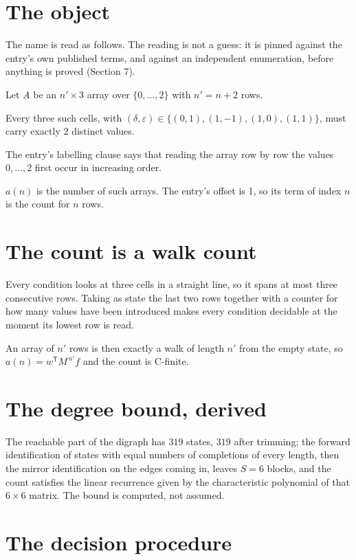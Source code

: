 \documentclass[11pt]{article}
\theoremstyle{definition}
\begin{document}
\section{The object}

The name is read as follows. The reading is not a guess: it is pinned against the entry's own published terms, and against an independent enumeration, before anything is proved (Section 7).

Let $A$ be an $n' \times 3$ array over $\{0,\dots,2\}$ with $n' = n + 2$ rows.

Every three such cells, with $(\delta,\varepsilon) \in \{(0,1), (1,-1), (1,0), (1,1)\}$, must carry exactly $2$ distinct values.

The entry's labelling clause says that reading the array row by row the values $0,\dots,2$ first occur in increasing order.

$a(n)$ is the number of such arrays. The entry's offset is 1, so its term of index $n$ is the count for $n$ rows.

\section{The count is a walk count}

Every condition looks at three cells in a straight line, so it spans at most three consecutive rows. Taking as state the last two rows together with a counter for how many values have been introduced makes every condition decidable at the moment its lowest row is read.

An array of $n'$ rows is then exactly a walk of length $n'$ from the empty state, so $a(n) = w^{\mathsf T}M^{\,n'}f$ and the count is C-finite.

\section{The degree bound, derived}

The reachable part of the digraph has $319$ states, $319$ after trimming; the forward identification of states with equal numbers of completions of every length, then the mirror identification on the edges coming in, leaves $S = 6$ blocks, and the count satisfies the linear recurrence given by the characteristic polynomial of that $6\times6$ matrix. The bound is computed, not assumed.

\section{The decision procedure}
\end{document}
